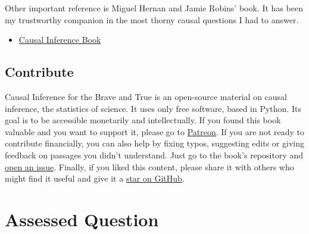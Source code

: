 \documentclass[
  letterpaper,
  DIV=11,
  numbers=noendperiod]{scrreprt}
\providecommand{\tightlist}{%
  \setlength{\itemsep}{0pt}\setlength{\parskip}{0pt}}\usepackage{longtable,booktabs,array}
\begin{document}
Other important reference is Miguel Hernan and Jamie Robins' book. It
has been my trustworthy companion in the most thorny causal questions I
had to answer.

\begin{itemize}
\tightlist
\item
  \href{https://www.hsph.harvard.edu/miguel-hernan/causal-inference-book/}{Causal
  Inference Book}
\end{itemize}

\hypertarget{contribute}{%
\section{Contribute}\label{contribute}}

Causal Inference for the Brave and True is an open-source material on
causal inference, the statistics of science. It uses only free software,
based in Python. Its goal is to be accessible monetarily and
intellectually. If you found this book valuable and you want to support
it, please go to
\href{https://www.patreon.com/causal_inference_for_the_brave_and_true}{Patreon}.
If you are not ready to contribute financially, you can also help by
fixing typos, suggesting edits or giving feedback on passages you didn't
understand. Just go to the book's repository and
\href{https://github.com/matheusfacure/python-causality-handbook/issues}{open
an issue}. Finally, if you liked this content, please share it with
others who might find it useful and give it a
\href{https://github.com/matheusfacure/python-causality-handbook/stargazers}{star
on GitHub}.


\hypertarget{assessed-question-8}{%
\chapter{Assessed Question}\label{assessed-question-8}}
\end{document}
